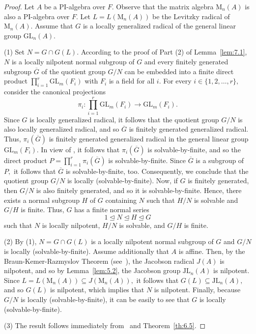 \documentclass{amsart}
\theoremstyle{definition}
\begin{document}
\begin{proof} Let $A$ be a PI-algebra over $F$. Observe that the matrix algebra $\mathrm{M}_n(A)$ is also a PI-algebra over $F$. Let $L=L(\mathrm{M}_n(A))$ be the Levitzky radical of $\mathrm{M}_n(A)$.  Assume that $G$ is a locally generalized radical of the general linear group $\mathrm{GL}_n(A).$ 
	
(1) Set $N=G\cap G(L)$. According to the proof of Part (2) of Lemma~\ref{lem:7.1}, $N$ is a locally nilpotent normal subgroup of $G$ and every finitely generated subgroup $\overline{G}$ of the quotient group $G/N$ can be embedded into a finite direct product $\prod_{i=1}^{r}\mathrm{GL}_m(F_i)$ with $F_i$ is a field for all $i$. For every $i\in\{1,2,\ldots, r\},$ consider the canonical projections 
	$$\pi_i: \prod_{i=1}^{r}\mathrm{GL}_m(F_i)\longrightarrow \mathrm{GL}_m(F_i).$$ Since $G$ is locally generalized radical, it follows that the quotient group $G/N$ is also locally generalized radical, and so $\overline{G}$ is finitely generated generalized radical. Thus, $\pi_i(\overline{G})$ is finitely generated generalized radical in the general linear group $\mathrm{GL}_m(F_i).$ In view of \cite[Corollary 1.4.5]{Bo_Dixon_2017}, it follows that $\pi_i(\overline{G})$ is solvable-by-finite, and so the direct product $P=\prod_{i=1}^{r}\pi_i(\overline{G})$ is solvable-by-finite. Since  $\overline{G}$ is a subgroup of $P,$ it follows that $\overline{G}$ is solvable-by-finite, too. Consequently, we conclude that the quotient group $G/N$ is locally (solvable-by-finite). Now, if $G$ is finitely generated, then $G/N$ is also finitely generated, and so it is solvable-by-finite. Hence, there exists a normal subgroup $H$ of $G$ containing $N$ such that $H/N$ is solvable and $G/H$ is finite.
	Thus, $G$ has a finite normal series $$1\trianglelefteq N\trianglelefteq H\trianglelefteq G$$ such that $N$ is locally nilpotent, $H/N$ is solvable, and $G/H$ is finite. 
	
(2) By (1), $N=G\cap G(L)$ is a locally nilpotent normal subgroup of $G$ and $G/N$ is locally (solvable-by-finite). Assume additionally that $A$ is affine. Then, by the Braun-Kemer-Razmyslov Theorem (see~\cite[Theorem~ 1.2]{Pa_BelovRowen_2014}), the Jacobson radical $J(A)$ is nilpotent, and so by Lemma~\ref{lem:5.2}, the Jacobson group $\mathrm{JL}_n(A)$ is nilpotent. Since $L=L(\mathrm{M}_n(A))\subseteq J(\mathrm{M}_n(A)),$ it follows that $G(L)\subseteq \mathrm{JL}_n(A),$ and so $G(L)$ is nilpotent, which implies that $N$ is nilpotent. Finally, because $G/N$ is locally (solvable-by-finite), it can be easily to see that $G$ is locally (solvable-by-finite).
	
(3) The result follows  immediately from~\cite[Corollary 3]{Pa_BelovRowenVishne_2006} and Theorem~\ref{th:6.5}.
\end{proof}
\end{document}
